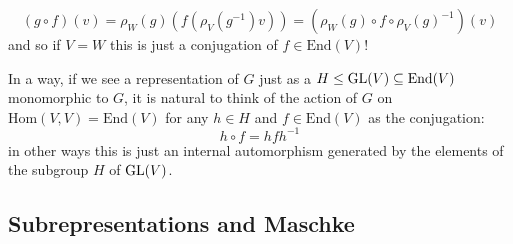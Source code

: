 \documentclass[11pt]{scrartcl}
\begin{document}
	$$\left(g\circ f\right)(v)=\rho_W(g)\left(f\left(\rho_V(g^{-1})v\right)\right)=\left(\rho_W(g)\circ f \circ \rho_V(g)^{-1}\right)(v)$$
	and so if $V=W$ this is just a conjugation of $f\in \text{End}(V)$!
	\begin{remark}
		In a way, if we see a representation of $G$ just as a $H\le \operatorname{GL}(V)\subseteq \text{End}(V)$ monomorphic to $G$, it is natural to think of the action of $G$ on $\text{Hom}(V,V)=\text{End}(V)$ for any $h\in H$ and $f\in \text{End}(V)$ as the conjugation:
		$$h\circ f=hfh^{-1}$$
		in other ways this is just an internal automorphism generated by the elements of the subgroup $H$ of $\operatorname{GL}(V)$.
	\end{remark}
	\subsection{Subrepresentations and Maschke}
	
\end{document}
